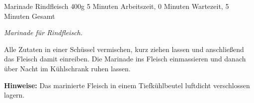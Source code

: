 \begin{recipe}{Marinade Rindfleisch} {400g} {5 Minuten Arbeitszeit, 0 Minuten Wartezeit, 5 Minuten Gesamt}

  \freeform{}\textit{Marinade für Rindfleisch.}


  Alle Zutaten in einer Schüssel vermischen, kurz ziehen lassen und anschließend das Fleisch damit einreiben.
  Die Marinade ins Fleisch einmassieren und danach über Nacht im Kühlschrank ruhen lassen.

  \freeform{}\hrulefill{}

  \freeform{}\textbf{Hinweise:}
  Das marinierte Fleisch in einem Tiefkühlbeutel luftdicht verschlossen lagern.

\end{recipe}
